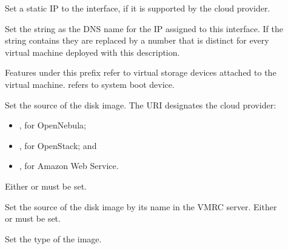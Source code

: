 \documentclass[letterpaper,10pt,english]{sphinxmanual}
\begin{document}
\begin{description}
\item[{}] \leavevmode
Set a static IP to the interface, if it is supported by the cloud provider.

\item[{}] \leavevmode
Set the string as the DNS name for the IP assigned to this interface. If the
string contains  they are replaced by a number that is distinct for
every virtual machine deployed with this  description.

\item[{}] \leavevmode
Features under this prefix refer to virtual storage devices attached to
the virtual machine.  refers to system boot device.

\item[{}] \leavevmode
Set the source of the disk image. The URI designates the cloud provider:
\begin{itemize}
\item {} 
, for OpenNebula;

\item {} 
, for OpenStack; and

\item {} 
, for Amazon Web Service.

\end{itemize}

Either  or  must be set.

\item[{}] \leavevmode
Set the source of the disk image by its name in the VMRC server.
Either  or  must be set.

\item[{}] \leavevmode
Set the type of the image.


\end{description}
\end{document}
